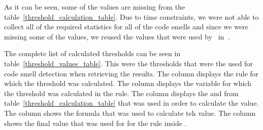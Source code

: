 As it can be seen, some of the values are missing from the table~\ref{threshold_calculation_table}.
Due to time constraints, we were not able to collect all of the required statistics for all of the code smells
and since we were missing some of the values, we reused the values that were used by~\citeauthor{ios_code_smell_paper} in~\cite{ios_code_smell_paper}.

The complete list of calculated thresholds can be seen in table~\ref{threshold_values_table}.
This were the thresholds that were the used for code smell detection when retrieving the results.
The column  displays the rule for which the threshold was calculated.
The column  displays the variable for which the threshold was calculated in the rule.
The column  displays the  and  from table~\ref{threshold_calculation_table}
that was used in order to calculate the value.
The column  shows the formula that was used to calculate teh value.
The column  shows the final value that was used for  for the rule inside .


